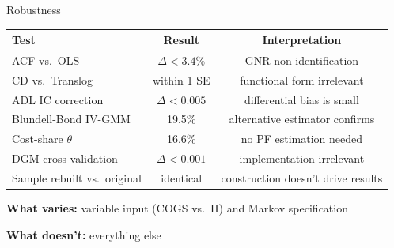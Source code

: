\documentclass[aspectratio=169,11pt]{beamer}
\begin{document}
\begin{frame}{Robustness}

\begin{tabular}{lcc}
\toprule
Test & Result & Interpretation \\
\midrule
ACF vs.\ OLS & $\Delta < 3.4\%$ & GNR non-identification \\
CD vs.\ Translog & within 1 SE & functional form irrelevant \\
ADL IC correction & $\Delta < 0.005$ & differential bias is small \\
Blundell-Bond IV-GMM & 19.5\% & alternative estimator confirms \\
Cost-share $\theta$ & 16.6\% & no PF estimation needed \\
DGM cross-validation & $\Delta < 0.001$ & implementation irrelevant \\
Sample rebuilt vs.\ original & identical & construction doesn't drive results \\
\bottomrule
\end{tabular}

\bigskip

\textbf{What varies:} variable input (COGS vs.\ II) and Markov specification

\textbf{What doesn't:} everything else

\end{frame}
\end{document}
